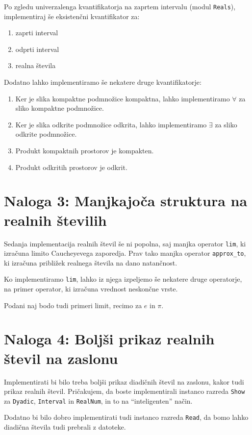 \documentclass[a4paper]{article}
\begin{document}
Po zgledu univerzalenga kvantifikatorja na zaprtem intervalu (modul
\texttt{Reals}), implementiraj še eksistenčni kvantifikator za:
%
\begin{enumerate}
\item zaprti interval
\item odprti interval
\item realna števila
\end{enumerate}
%
Dodatno lahko implementiramo še nekatere druge kvantifikatorje:
%
\begin{enumerate}
\item Ker je slika kompaktne podmnožice kompaktna, lahko
  implementiramo $\forall$ za sliko kompaktne podmnožice.
\item Ker je slika odkrite podmnožice odkrita, lahko
  implementiramo $\exists$ za sliko odkrite podmnožice.
\item Produkt kompaktnih prostorov je kompakten.
\item Produkt odkritih prostorov je odkrit.
\end{enumerate}

\section*{Naloga 3: Manjkajoča struktura na realnih številih}

Sedanja implementacija realnih števil še ni popolna, saj manjka
operator \texttt{lim}, ki izračuna limito Caucheyevega zaporedja. Prav
tako manjka operator \texttt{approx\_to}, ki izračuna približek
realnega števila na dano natančnost.

Ko implementiramo \texttt{lim}, lahko iz njega izpeljemo še nekatere
druge operatorje, na primer operator, ki izračuna vrednost neskončne
vrste.

Podani naj bodo tudi primeri limit, recimo za $e$ in $\pi$.

\section*{Naloga 4: Boljši prikaz realnih števil na zaslonu}

Implementirati bi bilo treba boljši prikaz diadičnih števil na
zaslonu, kakor tudi prikaz realnih števil. Pričakujem, da boste
implementirali instanco razreda \texttt{Show} za \texttt{Dyadic},
\texttt{Interval} in \texttt{RealNum}, in to na ``inteligenten''
način.

Dodatno bi bilo dobro implementirati tudi instanco razreda
\texttt{Read}, da bomo lahko diadična števila tudi prebrali z
datoteke.
\end{document}
